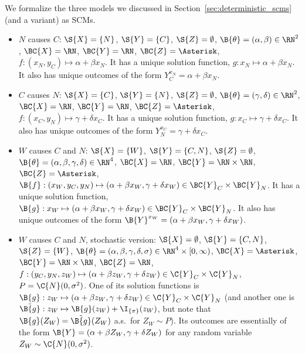 \begin{Eg}\label{ex:scms_formal}
  We formalize the three models we discussed in Section~\ref{sec:deterministic_scms} (and a variant) as SCMs.
  \begin{itemize}
    \item $N$ causes $C$:
      $\S{X} = \{N\}$, $\S{Y} = \{C\}$, $\S{Z} = \emptyset$, $\B{\theta} = (\alpha,\beta) \in \RN^2$, 
      $\BC{X} = \RN$, $\BC{Y} = \RN$, $\BC{Z} = \Asterisk$, $f : (x_N,y_C) \mapsto \alpha + \beta x_N$.
      It has a unique solution function, $g : x_N \mapsto \alpha + \beta x_N$.
      It also has unique outcomes of the form $Y_C^{x_N} = \alpha + \beta x_N$.
    \item $C$ causes $N$:
      $\S{X} = \{C\}$, $\S{Y} = \{N\}$, $\S{Z} = \emptyset$, $\B{\theta} = (\gamma,\delta) \in \RN^2$, 
      $\BC{X} = \RN$, $\BC{Y} = \RN$, $\BC{Z} = \Asterisk$, $f : (x_C,y_N) \mapsto \gamma + \delta x_C$.
      It has a unique solution function, $g : x_C \mapsto \gamma + \delta x_C$.
      It also has unique outcomes of the form $Y_N^{x_C} = \gamma + \delta x_C$.
    \item $W$ causes $C$ and $N$:
      $\S{X} = \{W\}$, $\S{Y} = \{C,N\}$, $\S{Z} = \emptyset$, $\B{\theta} = (\alpha,\beta,\gamma,\delta) \in \RN^4$, 
      $\BC{X} = \RN$, $\BC{Y} = \RN \times \RN$, $\BC{Z} = \Asterisk$, $\B{f} : (x_W,y_C,y_N) \mapsto (\alpha + \beta x_W, \gamma + \delta x_W) \in \BC{Y}_C \times \BC{Y}_N$.
      It has a unique solution function, $\B{g} : x_W \mapsto (\alpha + \beta x_W, \gamma + \delta x_W) \in \BC{Y}_C \times \BC{Y}_N$.
      It also has unique outcomes of the form $\B{Y}^{x_W} = (\alpha + \beta x_W, \gamma + \delta x_W)$.
    \item $W$ causes $C$ and $N$, stochastic version:
      $\S{X} = \emptyset$, $\S{Y} = \{C,N\}$, $\S{Z} = \{W\}$, $\B{\theta} = (\alpha,\beta,\gamma,\delta,\sigma) \in \RN^4 \times [0,\infty)$, 
      $\BC{X} = \Asterisk$, $\BC{Y} = \RN \times \RN$, $\BC{Z} = \RN$, $f : (y_C,y_N,z_W) \mapsto (\alpha + \beta z_W, \gamma + \delta z_W) \in \C{Y}_C \times \C{Y}_N$, $P = \C{N}(0,\sigma^2)$.
      One of its solution functions is $\B{g} : z_W \mapsto (\alpha + \beta z_W, \gamma + \delta z_W) \in \C{Y}_C \times \C{Y}_N$ (and another one is $\tilde{\B{g}} : z_W \mapsto \B{g}(z_W) + \I_{\{\pi\}}(z_W)$, but note that $\B{g}(Z_W) = \tilde{\B{g}}(Z_W)$ a.s.\ for $Z_W \sim P$).
      Its outcomes are essentially of the form $\B{Y} = (\alpha + \beta Z_W, \gamma + \delta Z_W)$ for any random variable $Z_W \sim \C{N}(0,\sigma^2)$.
  \end{itemize}
\end{Eg}

